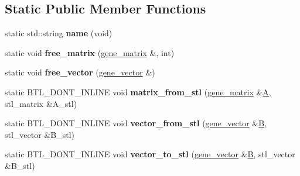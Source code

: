 \subsection*{Static Public Member Functions}
\begin{DoxyCompactItemize}
\item 
\mbox{\label{classeigen3__interface_afc03a46ad86db41de7cd34bcd5099603}} 
static std\+::string {\bfseries name} (void)
\item 
\mbox{\label{classeigen3__interface_a58c597fc0ee6719d4a60ade9acecd200}} 
static void {\bfseries free\+\_\+matrix} (\hyperlink{group___core___module_class_eigen_1_1_matrix}{gene\+\_\+matrix} \&, int)
\item 
\mbox{\label{classeigen3__interface_a0aa4de6c25acfc0c54aaff6522bfffb8}} 
static void {\bfseries free\+\_\+vector} (\hyperlink{group___core___module_class_eigen_1_1_matrix}{gene\+\_\+vector} \&)
\item 
\mbox{\label{classeigen3__interface_a00f3760d334d5039ff0e2f13129240db}} 
static B\+T\+L\+\_\+\+D\+O\+N\+T\+\_\+\+I\+N\+L\+I\+NE void {\bfseries matrix\+\_\+from\+\_\+stl} (\hyperlink{group___core___module_class_eigen_1_1_matrix}{gene\+\_\+matrix} \&\hyperlink{group___core___module_class_eigen_1_1_matrix}{A}, stl\+\_\+matrix \&A\+\_\+stl)
\item 
\mbox{\label{classeigen3__interface_a20b1dfb5d24c22fd0621bbfa4c5ef29b}} 
static B\+T\+L\+\_\+\+D\+O\+N\+T\+\_\+\+I\+N\+L\+I\+NE void {\bfseries vector\+\_\+from\+\_\+stl} (\hyperlink{group___core___module_class_eigen_1_1_matrix}{gene\+\_\+vector} \&\hyperlink{group___core___module_class_eigen_1_1_matrix}{B}, stl\+\_\+vector \&B\+\_\+stl)
\item 
\mbox{\label{classeigen3__interface_a3ff77e166b0399ddb6f6fc3904a8d388}} 
static B\+T\+L\+\_\+\+D\+O\+N\+T\+\_\+\+I\+N\+L\+I\+NE void {\bfseries vector\+\_\+to\+\_\+stl} (\hyperlink{group___core___module_class_eigen_1_1_matrix}{gene\+\_\+vector} \&\hyperlink{group___core___module_class_eigen_1_1_matrix}{B}, stl\+\_\+vector \&B\+\_\+stl)
\item 
\mbox{\label{classeigen3__interface_a1ea18848f5c77b724e3f8482749dba5a}} 

\end{DoxyCompactItemize}
